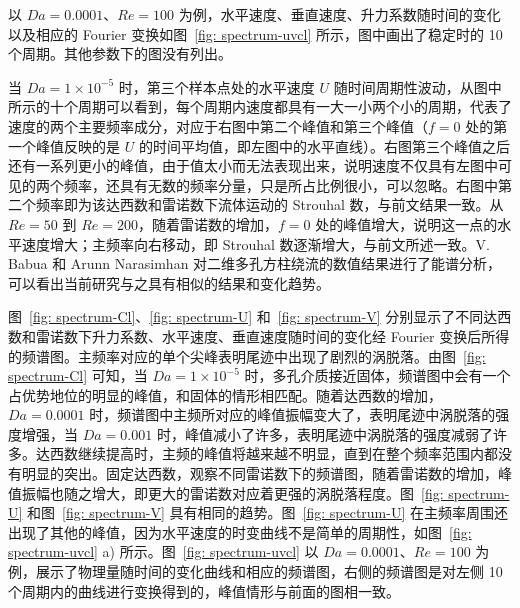 以 $Da=0.0001$、$Re=100$ 为例，水平速度、垂直速度、升力系数随时间的变化以及相应的 Fourier 变换如图~\ref{fig: spectrum-uvcl} 所示，图中画出了稳定时的 10 个周期。其他参数下的图没有列出。

当 $Da=1\times 10^{-5}$ 时，第三个样本点处的水平速度 $U$ 随时间周期性波动，从图中所示的十个周期可以看到，每个周期内速度都具有一大一小两个小的周期，代表了速度的两个主要频率成分，对应于右图中第二个峰值和第三个峰值（$f=0$ 处的第一个峰值反映的是 $U$ 的时间平均值，即左图中的水平直线）。右图第三个峰值之后还有一系列更小的峰值，由于值太小而无法表现出来，说明速度不仅具有左图中可见的两个频率，还具有无数的频率分量，只是所占比例很小，可以忽略。右图中第二个频率即为该达西数和雷诺数下流体运动的 Strouhal 数，与前文结果一致。从 $Re=50$ 到 $Re=200$，随着雷诺数的增加，$f=0$ 处的峰值增大，说明这一点的水平速度增大；主频率向右移动，即 Strouhal 数逐渐增大，与前文所述一致。V. Babua 和 Arunn Narasimhan \cite{Babu2010} 对二维多孔方柱绕流的数值结果进行了能谱分析，可以看出当前研究与之具有相似的结果和变化趋势。%

图~\ref{fig: spectrum-Cl}、\ref{fig: spectrum-U} 和~\ref{fig: spectrum-V} 分别显示了不同达西数和雷诺数下升力系数、水平速度、垂直速度随时间的变化经 Fourier 变换后所得的频谱图。主频率对应的单个尖峰表明尾迹中出现了剧烈的涡脱落。由图~\ref{fig: spectrum-Cl} 可知，当 $Da=1\times 10^{-5}$ 时，多孔介质接近固体，频谱图中会有一个占优势地位的明显的峰值，和固体的情形相匹配。随着达西数的增加，$Da=0.0001$ 时，频谱图中主频所对应的峰值振幅变大了，表明尾迹中涡脱落的强度增强，当 $Da=0.001$ 时，峰值减小了许多，表明尾迹中涡脱落的强度减弱了许多。达西数继续提高时，主频的峰值将越来越不明显，直到在整个频率范围内都没有明显的突出。固定达西数，观察不同雷诺数下的频谱图，随着雷诺数的增加，峰值振幅也随之增大，即更大的雷诺数对应着更强的涡脱落程度。图~\ref{fig: spectrum-U} 和图~\ref{fig: spectrum-V} 具有相同的趋势。图~\ref{fig: spectrum-U} 在主频率周围还出现了其他的峰值，因为水平速度的时变曲线不是简单的周期性，如图~\ref{fig: spectrum-uvcl} a) 所示。图~\ref{fig: spectrum-uvcl} 以 $Da=0.0001$、$Re=100$ 为例，展示了物理量随时间的变化曲线和相应的频谱图，右侧的频谱图是对左侧 10 个周期内的曲线进行变换得到的，峰值情形与前面的图相一致。%

